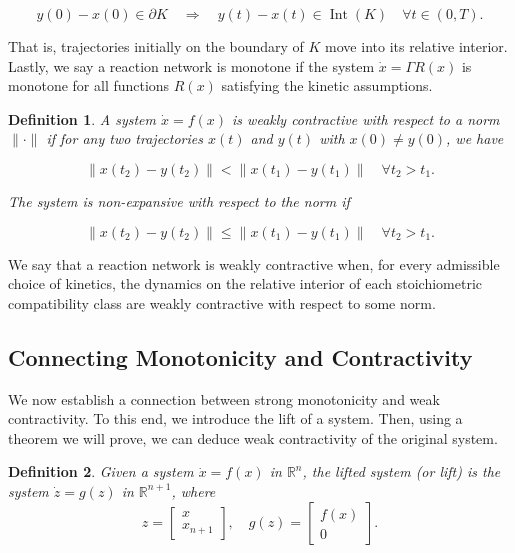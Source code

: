 \documentclass{article}
\newtheorem{define}{Definition}
\begin{document}
\[
y(0) - x(0) \in \partial K \quad \Rightarrow \quad y(t) - x(t) \in \operatorname{Int}(K) \quad \forall t \in (0, T).
\]

That is, trajectories initially on the boundary of $K$ move into its relative interior. Lastly, we say a reaction network is monotone if the system $\dot{x} = \Gamma R(x)$ is monotone for all functions $R(x)$ satisfying the kinetic assumptions.


\begin{define}
A system $\dot{x} = f(x)$ is \textit{weakly contractive} with respect to a norm $\| \cdot \|$ if for any two trajectories $x(t)$ and $y(t)$ with $x(0) \neq y(0)$, we have

\[
\|x(t_2) - y(t_2) \| < \|x(t_1) - y(t_1) \| \quad \forall t_2 > t_1.
\]

The system is \textit{non-expansive} with respect to the norm if

\[
\|x(t_2) - y(t_2) \| \leq \|x(t_1) - y(t_1) \| \quad \forall t_2 > t_1.
\]
\end{define}

We say that a reaction network is weakly contractive when, for every admissible choice of kinetics, the dynamics on the relative interior of each stoichiometric compatibility class are weakly contractive with respect to some norm.

\subsection{Connecting Monotonicity and Contractivity}
\label{sec:connect_montone_contractive}

We now establish a connection between strong monotonicity and weak contractivity. To this end, we introduce the lift of a system. Then, using a theorem we will prove, we can deduce weak contractivity of the original system.



\begin{define}
Given a system \( \dot{x} = f(x) \) in \( \mathbb{R}^n \), the \textit{lifted system} (or lift) is the system \( \dot{z} = g(z) \) in \( \mathbb{R}^{n+1} \), where
\[
z = \begin{bmatrix} x \\ x_{n+1} \end{bmatrix}, \quad g(z) = \begin{bmatrix} f(x) \\ 0 \end{bmatrix}.
\]
\end{define}
\end{document}
